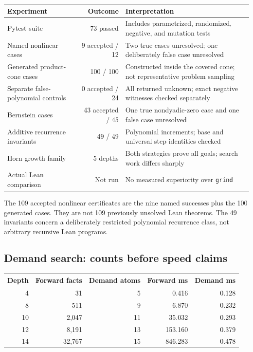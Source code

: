 \documentclass[11pt,a4paper]{article}
\newcommand{\grind}{\texttt{grind}}
\begin{document}
\begin{center}
\begin{tabularx}{\textwidth}{@{}p{}rY@{}}
\toprule
Experiment & Outcome & Interpretation\\
\midrule
Pytest suite & 73 passed & Includes parametrized, randomized, negative, and mutation tests\\
Named nonlinear cases & 9 accepted / 12 & Two true cases unresolved; one deliberately false case unresolved\\
Generated product-cone cases & 100 / 100 & Constructed inside the covered cone; not representative problem sampling\\
Separate false-polynomial controls & 0 accepted / 24 & All returned unknown; exact negative witnesses checked separately\\
Bernstein cases & 43 accepted / 45 & One true nondyadic-zero case and one false case unresolved\\
Additive recurrence invariants & 49 / 49 & Polynomial increments; base and universal step identities checked\\
Horn growth family & 5 depths & Both strategies prove all goals; search work differs sharply\\
Actual Lean comparison & Not run & No measured superiority over \grind\\
\bottomrule
\end{tabularx}
\end{center}

The 109 accepted nonlinear certificates are the nine named successes plus the
100 generated cases. They are not 109 previously unsolved Lean theorems. The
49 invariants concern a deliberately restricted polynomial recurrence class,
not arbitrary recursive Lean programs.

\subsection{Demand search: counts before speed claims}

\begin{center}
\begin{tabular}{@{}rrrrr@{}}
\toprule
Depth & Forward facts & Demand atoms & Forward ms & Demand ms\\
\midrule
4 & 31 & 5 & 0.416 & 0.128 \\
8 & 511 & 9 & 6.870 & 0.232 \\
10 & 2,047 & 11 & 35.032 & 0.293 \\
12 & 8,191 & 13 & 153.160 & 0.379 \\
14 & 32,767 & 15 & 846.283 & 0.478 \\
\bottomrule
\end{tabular}
\end{center}
\end{document}
